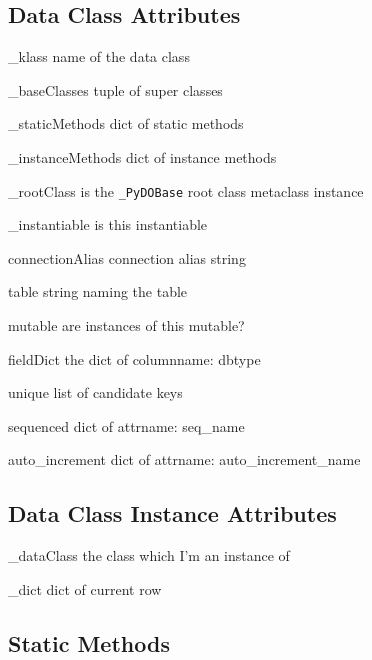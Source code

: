 \documentclass[titlepage]{manual}
\begin{document}
\subsection{Data Class Attributes}
\begin{argdesc}
\item[_klass] name of the data class
\item[_baseClasses] tuple of super classes
\item[_staticMethods] dict of static methods
\item[_instanceMethods] dict of instance methods
\item[_rootClass] is the \texttt{_PyDOBase} root class metaclass
instance
\item[_instantiable] is this instantiable
\item[connectionAlias] connection alias string
\item[table] string naming the table
\item[mutable] are instances of this mutable?
\item[fieldDict] the dict of columnname: dbtype
\item[unique] list of candidate keys
\item[sequenced] dict of attrname: seq_name
\item[auto_increment] dict of attrname: auto_increment_name
\end{argdesc}

\subsection{Data Class Instance Attributes}
\begin{argdesc}
\item[_dataClass] the class which I'm an instance of
\item[_dict] dict of current row
\end{argdesc}

\subsection{Static Methods}
\end{document}

